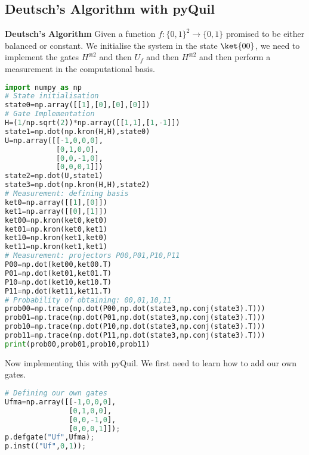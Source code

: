 \subsection{Deutsch's Algorithm with pyQuil}

\begin{tcolorbox}[standard jigsaw,
    opacityback=0,  %
    boxrule=0.5pt]
    {\bf Deutsch's Algorithm}
    \tcbline
    Given a function $f:\{0,1\}^2\rightarrow \{0,1\}$ promised to be either balanced or constant. We initialise the system in the state $\ket{00}$, we need to implement the gates $H^{\otimes 2}$ and then $U_f$ and then $H^{\otimes 2}$ and then perform a measurement in the computational basis.
\end{tcolorbox}

\begin{lstlisting}[language=Python,caption={Deutsch's algorithm implemented in Python only},label={lst:DApython},frame=single] 
import numpy as np
# State initialisation
state0=np.array([[1],[0],[0],[0]]) 
# Gate Implementation
H=(1/np.sqrt(2))*np.array([[1,1],[1,-1]]) 
state1=np.dot(np.kron(H,H),state0)        
U=np.array([[-1,0,0,0],
            [0,1,0,0],
            [0,0,-1,0],
            [0,0,0,1]])
state2=np.dot(U,state1)
state3=np.dot(np.kron(H,H),state2)
# Measurement: defining basis
ket0=np.array([[1],[0]])
ket1=np.array([[0],[1]])
ket00=np.kron(ket0,ket0)
ket01=np.kron(ket0,ket1)
ket10=np.kron(ket1,ket0)
ket11=np.kron(ket1,ket1)
# Measurement: projectors P00,P01,P10,P11
P00=np.dot(ket00,ket00.T)
P01=np.dot(ket01,ket01.T)
P10=np.dot(ket10,ket10.T)
P11=np.dot(ket11,ket11.T)
# Probability of obtaining: 00,01,10,11
prob00=np.trace(np.dot(P00,np.dot(state3,np.conj(state3).T)))
prob01=np.trace(np.dot(P01,np.dot(state3,np.conj(state3).T)))
prob10=np.trace(np.dot(P10,np.dot(state3,np.conj(state3).T)))
prob11=np.trace(np.dot(P11,np.dot(state3,np.conj(state3).T)))
print(prob00,prob01,prob10,prob11)
\end{lstlisting}

Now implementing this with pyQuil. We first need to learn how to add our own gates.

\begin{lstlisting}[language=Python]
# Defining our own gates
Ufma=np.array([[-1,0,0,0],
               [0,1,0,0],
               [0,0,-1,0],
               [0,0,0,1]]); 
p.defgate("Uf",Ufma); 
p.inst(("Uf",0,1)); 
\end{lstlisting}

